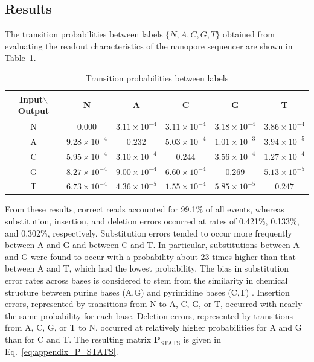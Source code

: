 \documentclass[sotsuron]{kuee}
\begin{document}
\subsection{Results}
The transition probabilities between labels $\{N,A,C,G,T\}$ obtained from evaluating the
readout characteristics of the nanopore sequencer are shown in
Table~\ref{tab:transition_matrix}.
\begin{table}
  \centering
  \caption{Transition probabilities between labels}
  \label{tab:transition_matrix}
  \begin{tabular}{c|ccccc}
    \hline
    Input$\backslash$Output & N & A & C & G & T \\
    \hline
    N & $0.000$ & $3.11 \times 10^{-4}$ & $3.11 \times 10^{-4}$ & $3.18 \times 10^{-4}$ & $3.86 \times 10^{-4}$  \\
    A & $9.28 \times 10^{-4}$ & $0.232$ & $5.03 \times 10^{-4}$ & $1.01 \times 10^{-3}$ & $3.94 \times 10^{-5}$ \\
    C & $5.95 \times 10^{-4}$ & $3.10 \times 10^{-4}$ & $0.244$ & $3.56 \times 10^{-4}$ & $1.27 \times 10^{-4}$ \\
    G & $8.27 \times 10^{-4}$ & $9.00 \times 10^{-4}$ & $6.60 \times 10^{-4}$ & $0.269$ & $5.13 \times 10^{-5}$ \\
    T & $6.73 \times 10^{-4}$ & $4.36 \times 10^{-5}$ & $1.55 \times 10^{-4}$ & $5.85 \times 10^{-5}$ & $0.247$ \\
    \hline
  \end{tabular}
\end{table}
From these results, correct reads accounted for 99.1\% of all events, whereas substitution,
insertion, and deletion errors occurred at rates of 0.421\%, 0.133\%, and 0.302\%, respectively.
Substitution errors tended to occur more frequently between A and G and between C and T.
In particular, substitutions between A and G were found to occur with a probability about 23 times
higher than that between A and T, which had the lowest probability.
The bias in substitution error rates across bases is considered to stem from the similarity in
chemical structure between purine bases (A,G) and pyrimidine bases (C,T)
\cite{10.1371/journal.pone.0257521}.
Insertion errors, represented by transitions from N to A, C, G, or T, occurred with nearly the
same probability for each base.
Deletion errors, represented by transitions from A, C, G, or T to N, occurred at relatively
higher probabilities for A and G than for C and T.
The resulting matrix $\bm{P}_{\mathrm{STATS}}$ is given in Eq.~\eqref{eq:appendix_P_STATS}.
\end{document}
